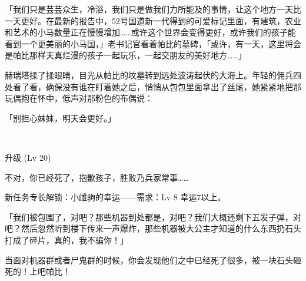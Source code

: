 「我们只是芸芸众生，冷浴，我们只是做我们力所能及的事情，让这个地方一天比一天更好。在最新的报告中，52号国道新一代得到的可爱标记里面，有建筑，农业和艺术的小马数量正在慢慢增加……或许这个世界会变得更好，或许我们的孩子能看到一个更美丽的小马国，」老书记官看着帕比的墓碑，「或许，有一天，这里将会是帕比那样天真烂漫的孩子一起玩乐，一起交朋友的美好地方……」

赫瑞塔揉了揉眼睛，目光从帕比的坟墓转到远处波涛起伏的大海上。年轻的佣兵四处看了看，确保没有谁在盯着她之后，悄悄从包包里面拿出了丝尾，她紧紧地把那玩偶抱在怀中，低声对那粉色的布偶说：

「别担心妹妹，明天会更好。」

~\vfill

\begin{note}
    升级 (Lv 20) 

    不对，你已经死了，抱歉孩子，胜败乃兵家常事……

    新任务专长解锁：小雌驹的幸运——需求：Lv 8 幸运7以上。

    「我们被包围了，对吧？那些机器到处都是，对吧？我们大概还剩下五发子弹，对吧？然后忽然听到楼下传来一声爆炸，那些机器被大公主才知道的什么东西扔石头打成了碎片，真的，我不骗你！」

    当面对机器群或者尸鬼群的时候，你会发现他们之中已经死了很多，被一块石头砸死的！上吧帕比！
\end{note}



